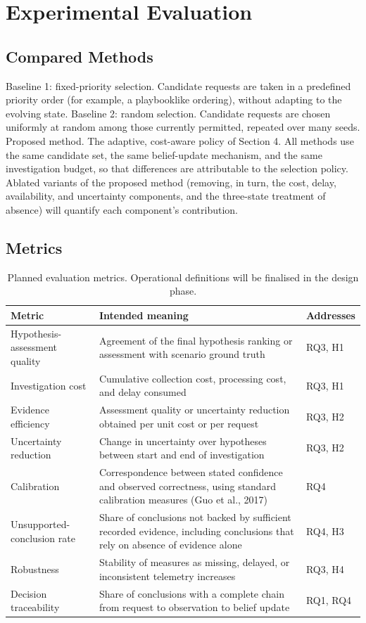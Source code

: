 \documentclass[a4paper,11pt,oneside]{article}
\begin{document}
\section{Experimental Evaluation}
\subsection{Compared Methods}
Baseline 1: fixed-priority selection. Candidate requests are taken in a predefined priority order (for example, a playbooklike ordering), without adapting to the evolving state.
Baseline 2: random selection. Candidate requests are chosen uniformly at random among those currently permitted, repeated over many seeds.
Proposed method. The adaptive, cost-aware policy of Section 4.
All methods use the same candidate set, the same belief-update mechanism, and the same investigation budget, so that differences are attributable to the selection policy. Ablated variants of the proposed method (removing, in turn, the cost, delay, availability, and uncertainty components, and the three-state treatment of absence) will quantify each component’s contribution.
\subsection{Metrics}
\begin{table}[htbp]
\centering
\caption{Planned evaluation metrics. Operational definitions will be finalised in the design phase.}
\label{tab:metrics}
\small
\begin{tabularx}{\textwidth}{@{}p{}X p{}@{}}
\toprule
\textbf{Metric} & \textbf{Intended meaning} & \textbf{Addresses} \\
\midrule
Hypothesis-assessment quality & Agreement of the final hypothesis ranking or assessment with scenario ground truth & RQ3, H1 \\
Investigation cost & Cumulative collection cost, processing cost, and delay consumed & RQ3, H1 \\
Evidence efficiency & Assessment quality or uncertainty reduction obtained per unit cost or per request & RQ3, H2 \\
Uncertainty reduction & Change in uncertainty over hypotheses between start and end of investigation & RQ3, H2 \\
Calibration & Correspondence between stated confidence and observed correctness, using standard calibration measures (Guo et al., 2017) & RQ4 \\
Unsupported-conclusion rate & Share of conclusions not backed by sufficient recorded evidence, including conclusions that rely on absence of evidence alone & RQ4, H3 \\
Robustness & Stability of measures as missing, delayed, or inconsistent telemetry increases & RQ3, H4 \\
Decision traceability & Share of conclusions with a complete chain from request to observation to belief update & RQ1, RQ4 \\
\bottomrule
\end{tabularx}
\end{table}
\end{document}
